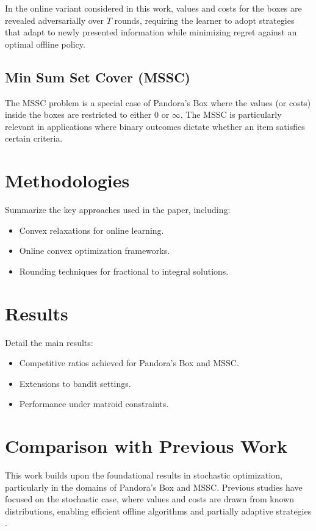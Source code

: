 \documentclass[11pt,a4paper]{article}
\begin{document}
In the online variant considered in this work, values and costs for the boxes are revealed adversarially over \( T \) rounds, requiring the learner to adopt strategies that adapt to newly presented information while minimizing regret against an optimal offline policy.

\subsection{Min Sum Set Cover (MSSC)}
The MSSC problem is a special case of Pandora’s Box where the values (or costs) inside the boxes are restricted to either \( 0 \) or \( \infty \). The MSSC is particularly relevant in applications where binary outcomes dictate whether an item satisfies certain criteria.
\pagebreak


\section{Methodologies}
Summarize the key approaches used in the paper, including:
\begin{itemize}
    \item Convex relaxations for online learning.
    \item Online convex optimization frameworks.
    \item Rounding techniques for fractional to integral solutions.
\end{itemize}

\section{Results}
Detail the main results:
\begin{itemize}
    \item Competitive ratios achieved for Pandora's Box and MSSC.
    \item Extensions to bandit settings.
    \item Performance under matroid constraints.
\end{itemize}

\section{Comparison with Previous Work}
This work builds upon the foundational results in stochastic optimization, particularly in the domains of Pandora’s Box and MSSC. Previous studies have focused on the stochastic case, where values and costs are drawn from known distributions, enabling efficient offline algorithms and partially adaptive strategies \cite{weitzman1978optimal, chawla2020pandora}.
\end{document}
